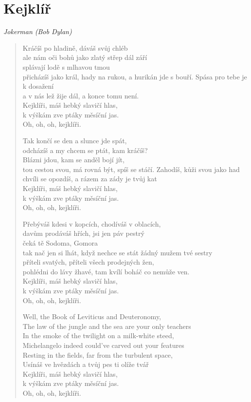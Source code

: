 \section*{Kejklíř}

\textit{Jokerman (Bob Dylan)}

\begin{verse}
Kráčíš po hladině, dáváš svůj chléb\\
ale nám oči bohů jako zlatý střep dál září\\ 
splávají lodě s mlhavou tmou\\
přicházíš jako král, hady na rukou, a hurikán jde s bouří. 
Spása pro tebe je k dosažení\\
a v nás lež žije dál, a konce tomu není. \\
Kejklíři, máš hebký slavičí hlas,\\
k výškám zve ptáky měsíční jas. \\
Oh, oh, oh, kejklíři.

Tak končí se den a slunce jde spát, \\
odcházíš a my chcem se ptát, kam kráčíš? \\
Blázni jdou, kam se anděl bojí jít, \\
tou cestou svou, má rovná být, spíš se stáčí.
Zahodíš, kůži svou jako had \\
chvíli se opozdíš, a rázem za zády je tvůj kat \\
Kejklíři, máš hebký slavičí hlas,\\
k výškám zve ptáky měsíční jas. \\
Oh, oh, oh, kejklíři.

Přebýváš kdesi v kopcích, chodíváš v oblacích, \\
davům prodáváš hřích, jsi jen páv pestrý \\
čeká tě Sodoma, Gomora \\
tak nač jen si lhát, když nechce se stát žádný mužem tvé sestry  \\
příteli svatých, příteli všech prodejných žen, \\
pohlédni do lávy žhavé, tam kvílí boháč co nemůže ven. \\
Kejklíři, máš hebký slavičí hlas,\\
k výškám zve ptáky měsíční jas. \\
Oh, oh, oh, kejklíři.

Well, the Book of Leviticus and Deuteronomy, \\
The law of the jungle and the sea are your only teachers \\
In the smoke of the twilight on a milk-white steed, \\
Michelangelo indeed could've carved out your features \\
Resting in the fields, far from the turbulent space, \\
Usínáš ve hvězdách a tvůj pes ti olíže tvář \\
Kejklíři, máš hebký slavičí hlas,\\
k výškám zve ptáky měsíční jas. \\
Oh, oh, oh, kejklíři.


\end{verse}
